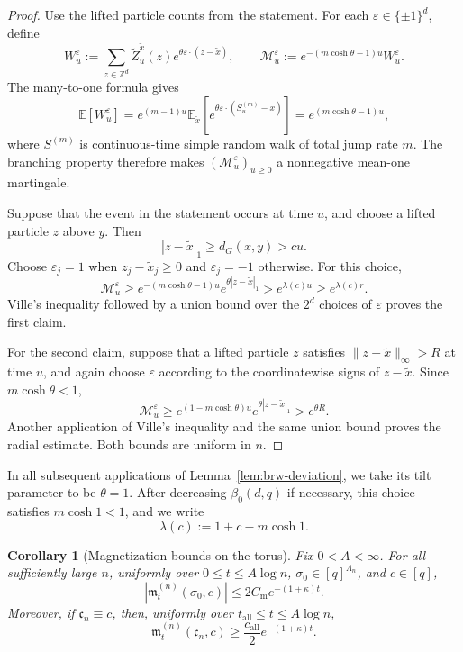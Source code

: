 \documentclass[letterpaper,11pt,reqno]{amsart}
\newtheorem{cor}[thm]{Corollary}
\theoremstyle{definition}
\begin{document}
\begin{proof}
Use the lifted particle counts from the statement. For each
\(\varepsilon\in\{\pm1\}^d\), define
\[
W_u^\varepsilon
:=
\sum_{z\in\mathbb Z^d}
\widetilde Z_u^{\tilde x}(z)
e^{\theta\varepsilon\cdot(z-\tilde x)},
\qquad
\mathcal M_u^\varepsilon
:=
e^{-(m\cosh\theta-1)u}W_u^\varepsilon.
\]
The many-to-one formula \cite{ManyToOne} gives
\[
\mathbb E[W_u^\varepsilon]
=
e^{(m-1)u}
\mathbb E_{\tilde x}
\left[e^{\theta\varepsilon\cdot(S_u^{(m)}-\tilde x)}\right]
=
e^{(m\cosh\theta-1)u},
\]
where \(S^{(m)}\) is continuous-time simple random walk of total jump rate \(m\).
The branching property therefore makes \((\mathcal M_u^\varepsilon)_{u\ge0}\) a nonnegative
mean-one martingale.

Suppose that the event in the statement occurs at time \(u\), and choose a lifted particle
\(z\) above \(y\). Then
\[
        |z-\tilde x|_1\ge d_G(x,y)>cu.
\]
Choose \(\varepsilon_j=1\) when \(z_j-\tilde x_j\ge0\) and
\(\varepsilon_j=-1\) otherwise. For this choice,
\[
\mathcal M_u^\varepsilon
\ge
e^{-(m\cosh\theta-1)u}e^{\theta|z-\tilde x|_1}
>
e^{\lambda(c)u}
\ge
e^{\lambda(c)r}.
\]
Ville's inequality followed by a union bound over the \(2^d\) choices of
\(\varepsilon\) proves the first claim.

For the second claim, suppose that a lifted particle \(z\) satisfies
\(\|z-\tilde x\|_\infty>R\) at time \(u\), and again choose
\(\varepsilon\) according to the coordinatewise signs of \(z-\tilde x\).
Since \(m\cosh\theta<1\),
\[
\mathcal M_u^\varepsilon
\ge
e^{(1-m\cosh\theta)u}e^{\theta|z-\tilde x|_1}
>
e^{\theta R}.
\]
Another application of Ville's inequality and the same union bound proves the
radial estimate. Both bounds are uniform in \(n\).
\end{proof}

In all subsequent applications of Lemma~\ref{lem:brw-deviation}, we take its
tilt parameter to be \(\theta=1\). After decreasing \(\beta_0(d,q)\) if
necessary, this choice satisfies \(m\cosh 1<1\), and we write
\[
        \lambda(c):=1+c-m\cosh 1.
\]

\begin{cor}[Magnetization bounds on the torus]
\label{cor:torus-magnetization-bounds}
Fix \(0<A<\infty\). For all sufficiently large \(n\), uniformly over
\(0\le t\le A\log n\), \(\sigma_0\in[q]^{\Lambda_n}\), and \(c\in[q]\),
\[
    \left|\mathfrak m_t^{(n)}(\sigma_0,c)\right|
    \le 2C_{\mathrm m}e^{-(1+\kappa)t}.
\]
Moreover, if \(\mathfrak c_n\equiv c\), then, uniformly over
\(t_{\mathrm{all}}\le t\le A\log n\),
\[
    \mathfrak m_t^{(n)}(\mathfrak c_n,c)
    \ge \frac{c_{\mathrm{all}}}{2}e^{-(1+\kappa)t}.
\]
\end{cor}
\end{document}
